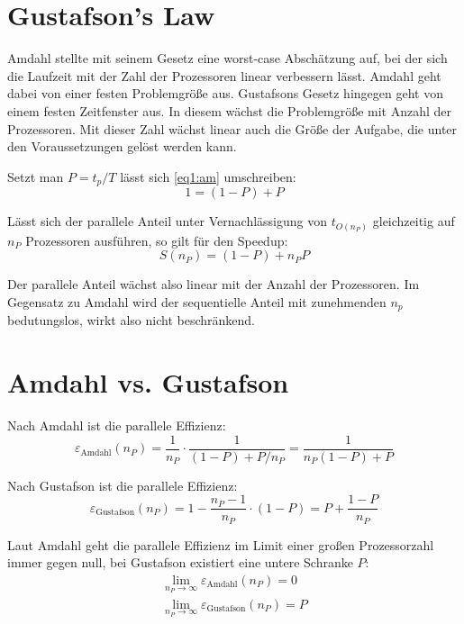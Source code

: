 		\section{Gustafson's Law}
		Amdahl stellte mit seinem Gesetz eine worst-case Abschätzung auf, bei der sich die Laufzeit mit der Zahl der Prozessoren linear verbessern lässt. Amdahl geht dabei von einer festen Problemgröße aus. Gustafsons Gesetz hingegen geht von einem festen Zeitfenster aus. In diesem wächst die Problemgröße mit Anzahl der Prozessoren. Mit dieser Zahl wächst linear auch die Größe der Aufgabe, die unter den Voraussetzungen gelöst werden kann.

		Setzt man $P=t_p/T$ lässt sich \ref{eq1:am} umschreiben:
		\begin{equation}
			1 = (1 - P) + P
		\end{equation}
		
		Lässt sich der parallele Anteil unter Vernachlässigung von $t_{O(n_P)}$ gleichzeitig auf $n_P$ Prozessoren ausführen, so gilt für den \Gls{Speedup}:
    		\begin{equation}
        		S(n_P) = (1 - P) + n_P P
    		\end{equation}
		
		Der parallele Anteil wächst also linear mit der Anzahl der Prozessoren. Im Gegensatz zu Amdahl wird der sequentielle Anteil mit zunehmenden $n_p$ bedutungslos, wirkt also nicht beschränkend.
		 
		\section{Amdahl vs. Gustafson}		
		Nach Amdahl ist die \gls{parallele Effizienz}:
        	\begin{equation}
           	\varepsilon_{\text{Amdahl}}(n_P)    = \frac1{n_P}\cdot \frac1{(1-P)+P/n_P} = \frac1{n_P(1-P)+P}
        	\end{equation}
        	
        	Nach Gustafson ist die \gls{parallele Effizienz}:
		\begin{equation}
			\varepsilon_{\text{Gustafson}}(n_P) = 1 - \frac{n_P-1}{n_P}\cdot (1-P) = P +\frac{1-P}{n_P}
		\end{equation}
		
		Laut Amdahl geht die \gls{parallele Effizienz} im Limit einer großen Prozessorzahl immer gegen null, bei Gustafson existiert eine untere Schranke $P$:
		\begin{gather*}
			\lim\limits_{n_P \rightarrow \infty}\varepsilon_{\text{Amdahl}}(n_P)    = 0 \\        
			\lim\limits_{n_P \rightarrow \infty}\varepsilon_{\text{Gustafson}}(n_P) = P
		\end{gather*}
		

